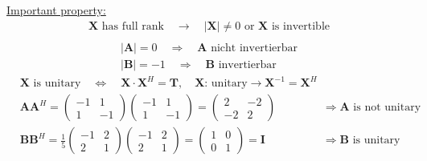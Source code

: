 \qquad\underline{Important property:}
\begin{align*}
	\mathbf{X}\text{ has full rank}\quad\rightarrow\quad\left|\mathbf{X}\right|\neq 0\text{ or $\mathbf{X}$ is invertible} \\
\end{align*}
\qquad{}
\begin{align*}
	&\left|\mathbf{A}\right|=0\quad\Rightarrow\quad\text{$\mathbf{A}$ nicht invertierbar}& \\
	&\left|\mathbf{B}\right|=-1\quad\Rightarrow\quad\text{$\mathbf{B}$ invertierbar}&
\end{align*}
\qquad{}
\begin{align*}
	&\mathbf{X}\text{ is unitary}\quad\Leftrightarrow\quad\mathbf{X\cdot X}^{H}=\mathbf{T},\quad\mathbf{X}\text{: unitary}\rightarrow\mathbf{X}^{-1}=\mathbf{X}^{H}& \\
	&\mathbf{AA}^{H}=
	\begin{pmatrix}
	-1 & 1 \\
	1 & -1
	\end{pmatrix}
	\begin{pmatrix}
	-1 & 1 \\
	1 & -1
	\end{pmatrix}=
	\begin{pmatrix}
	2 & -2 \\
	-2 & 2
	\end{pmatrix}&&\Rightarrow\mathbf{A}\text{ is not unitary}& \\
	&\mathbf{BB}^{H}=\frac{1}{5}
	\begin{pmatrix}
	-1 & 2 \\
	2 & 1
	\end{pmatrix}
	\begin{pmatrix}
	-1 & 2 \\
	2 & 1
	\end{pmatrix}=
	\begin{pmatrix}
	1 & 0 \\
	0 & 1
	\end{pmatrix}=\mathbf{I}&&\Rightarrow\mathbf{B}\text{ is unitary}&
\end{align*}

